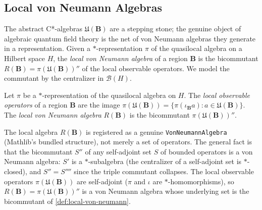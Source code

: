\subsection{Local von Neumann Algebras}

The abstract C*-algebras $\mathfrak{U}(\mathbf{B})$ are a stepping stone; the genuine object of algebraic quantum field theory is the net of von Neumann algebras they generate in a representation. Given a $*$-representation $\pi$ of the quasilocal algebra on a Hilbert space $H$, the \emph{local von Neumann algebra} of a region $\mathbf{B}$ is the bicommutant $R(\mathbf{B}) = \pi(\mathfrak{U}(\mathbf{B}))''$ of the local observable operators. We model the commutant by the centralizer in $\mathcal{B}(H)$.

\begin{definition}
    \label{def:local-von-neumann}
    \leanok
    Let $\pi$ be a $*$-representation of the quasilocal algebra on $H$. The \emph{local observable operators} of a region $\mathbf{B}$ are the image $\pi(\mathfrak{U}(\mathbf{B})) = \{\pi(\iota_{\mathbf{B}} a) : a \in \mathfrak{U}(\mathbf{B})\}$. The \emph{local von Neumann algebra} $R(\mathbf{B})$ is the bicommutant $\pi(\mathfrak{U}(\mathbf{B}))''$.
\end{definition}

\begin{definition}
    \label{def:local-von-neumann-algebra}
    \leanok
    The local algebra $R(\mathbf{B})$ is registered as a genuine \texttt{VonNeumannAlgebra} (Mathlib's bundled structure), not merely a set of operators. The general fact is that the bicommutant $S''$ of any self-adjoint set $S$ of bounded operators is a von Neumann algebra: $S'$ is a $*$-subalgebra (the centralizer of a self-adjoint set is $*$-closed), and $S'' = S''''$ since the triple commutant collapses. The local observable operators $\pi(\mathfrak{U}(\mathbf{B}))$ are self-adjoint ($\pi$ and $\iota$ are $*$-homomorphisms), so $R(\mathbf{B}) = \pi(\mathfrak{U}(\mathbf{B}))''$ is a von Neumann algebra whose underlying set is the bicommutant of \ref{def:local-von-neumann}.
\end{definition}

